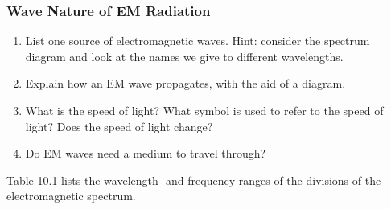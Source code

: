             \subsubsection{  Wave Nature of EM Radiation }
            \nopagebreak
      \label{m38778*id187264}\begin{enumerate}[noitemsep, label=\textbf{\arabic*}. ] 
            \label{m38778*uid4}\item List one source of electromagnetic waves. Hint: consider the spectrum diagram and look at the names we give to different wavelengths.\newline
\label{m38778*uid5}\item Explain how an EM wave propagates, with the aid of a diagram.\newline
\label{m38778*uid6}\item What is the speed of light? What symbol is used to refer to the speed of light? Does the speed of light change?\newline
\label{m38778*uid7}\item Do EM waves need a medium to travel through?\newline
\end{enumerate}
      \label{m38778*id187332}Table 10.1 lists the wavelength- and frequency ranges of the divisions of the electromagnetic spectrum.\par 
